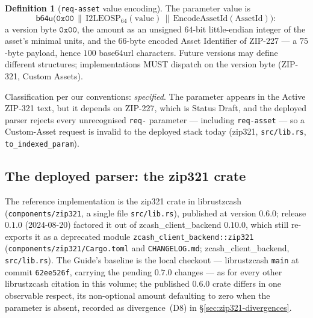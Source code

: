 \documentclass[11pt,a4paper]{article}
\theoremstyle{definition}
\newtheorem{definition}[theorem]{Definition}
\begin{document}
\begin{definition}[\texttt{req-asset} value encoding]\label{def:zip321-asset}
The parameter value is
\[
\mathsf{b64u}\bigl(\mathtt{0x00} \,\|\, \mathrm{I2LEOSP}_{64}(\mathrm{value})
\,\|\, \mathrm{EncodeAssetId}(\mathrm{AssetId})\bigr):
\]
a version byte $\mathtt{0x00}$, the amount as an unsigned $64$-bit
little-endian integer of the asset's minimal units, and the $66$-byte
encoded Asset Identifier of ZIP-227 --- a $75$-byte payload, hence $100$
base64url characters. Future versions may define different structures;
implementations MUST dispatch on the version byte (ZIP-321, Custom Assets).
\end{definition}

Classification per our conventions: \emph{specified}. The parameter appears
in the Active ZIP-321 text, but it depends on ZIP-227, which is Status
Draft, and the deployed parser rejects every unrecognised \texttt{req-}
parameter --- including \texttt{req-asset} --- so a Custom-Asset request is
invalid to the deployed stack today (\textsf{zip321},
\texttt{src/lib.rs}, \texttt{to\_indexed\_param}).

\subsection{The deployed parser: the \textsf{zip321} crate}
\label{sec:zip321-crate}

The reference implementation is the \textsf{zip321} crate in librustzcash
(\texttt{components/zip321}, a single file \texttt{src/lib.rs}), published
at version $0.6.0$; release $0.1.0$ (2024-08-20) factored it out of
\textsf{zcash\_client\_backend} $0.10.0$, which still re-exports it as a
deprecated module \texttt{zcash\_client\_backend::zip321}
(\texttt{components/zip321/Cargo.toml} and \texttt{CHANGELOG.md};
\textsf{zcash\_client\_backend}, \texttt{src/lib.rs}).
The Guide's baseline is the local checkout --- librustzcash \texttt{main}
at commit \texttt{62ee526f}, carrying the pending $0.7.0$ changes --- as
for every other librustzcash citation in this volume; the published
$0.6.0$ crate differs in one observable respect, its non-optional amount
defaulting to zero when the parameter is absent, recorded as
divergence~(D8) in \S\ref{sec:zip321-divergences}.
\end{document}
